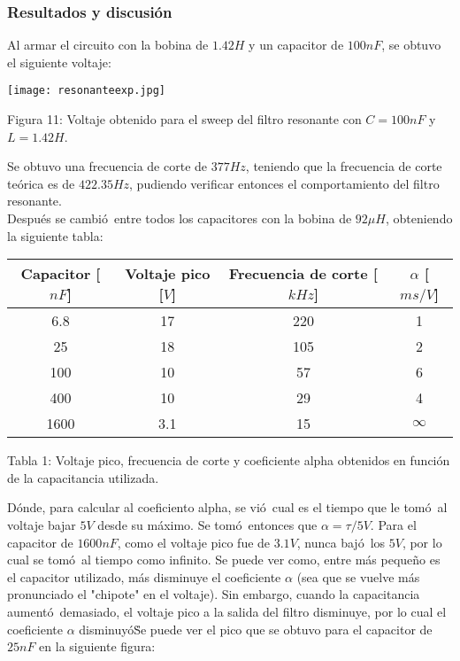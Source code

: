 \documentclass[11pt]{article}
\renewcommand{\=}[1]{\stackrel{#1}{=}} %
\theoremstyle{definition}
\theoremstyle{remark}
\begin{document}
\subsubsection{Resultados y discusi\'on}
Al armar el circuito con la bobina de $1.42H$ y un capacitor de $100nF$, se obtuvo el siguiente voltaje:
\begin{center}
\texttt{[image: resonanteexp.jpg]}
\end{center}
\begin{center}
Figura 11: Voltaje obtenido para el sweep del filtro resonante con $C=100nF$ y $L=1.42H$.
\end{center}
Se obtuvo una frecuencia de corte de $377Hz$, teniendo que la frecuencia de corte te\'orica es de $422.35Hz$, pudiendo verificar entonces el comportamiento del filtro resonante. \\
Despu\'es se cambi\'o\ entre todos los capacitores con la bobina de $92\mu H$, obteniendo la siguiente tabla:
\begin{center}
\begin{tabular}{||c|c|c|c||}
\hline
Capacitor [$nF$] & Voltaje pico [$V$] & Frecuencia de corte [$kHz$] & $\alpha$ [$ms/V$] \\ \hline
6.8 & 	17 & 	220  & 	1	 		\\ \hline
25 & 	18 & 	105 & 	2			\\ \hline
100 & 	10 & 	57 & 	6			\\ \hline
400 & 	10 & 	29 & 	4			\\ \hline
1600 & 	3.1 & 	15 & 	$\infty$		\\ \hline

\end{tabular}
\end{center}
\begin{center}
Tabla 1: Voltaje pico, frecuencia de corte y coeficiente alpha obtenidos en funci\'on de la capacitancia utilizada.
\end{center}
D\'onde, para calcular al coeficiento alpha, se vi\'o\ cual es el tiempo que le tom\'o\ al voltaje bajar $5V$ desde su m\'aximo. Se tom\'o\ entonces que $\alpha=\tau/5V$. Para el capacitor de $1600nF$, como el voltaje pico fue de $3.1V$, nunca baj\'o\ los $5V$, por lo cual se tom\'o\ al tiempo como infinito. Se puede ver como, entre m\'as peque\~no es el capacitor utilizado, m\'as disminuye el coeficiente $\alpha$ (sea que se vuelve m\'as pronunciado el "chipote" en el voltaje). Sin embargo, cuando la capacitancia aument\'o\ demasiado, el voltaje pico a la salida del filtro disminuye, por lo cual el coeficiente $\alpha$ disminuy\'o\. Se puede ver el pico que se obtuvo para el capacitor de $25nF$ en la siguiente figura:
\end{document}
